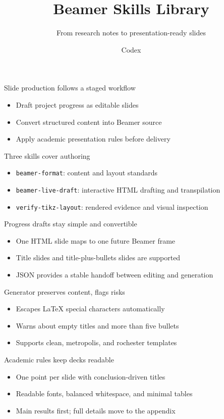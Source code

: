 \documentclass[10pt]{mycool}
\title[]{Beamer Skills Library}
\subtitle[]{From research notes to presentation-ready slides}
\author[]{Codex}
\institute[]{Beamer Skills Project}
\date[]{}
\begin{document}
\frame{\titlepage}

\begin{frame}{Slide production follows a staged workflow}
\begin{itemize}
  \item Draft project progress as editable slides
  \item Convert structured content into Beamer source
  \item Apply academic presentation rules before delivery
\end{itemize}
\end{frame}

\begin{frame}{Three skills cover authoring}
\begin{itemize}
  \item \texttt{beamer-format}: content and layout standards
  \item \texttt{beamer-live-draft}: interactive HTML drafting and transpilation
  \item \texttt{verify-tikz-layout}: rendered evidence and visual inspection
\end{itemize}
\end{frame}

\begin{frame}{Progress drafts stay simple and convertible}
\begin{itemize}
  \item One HTML slide maps to one future Beamer frame
  \item Title slides and title-plus-bullets slides are supported
  \item JSON provides a stable handoff between editing and generation
\end{itemize}
\end{frame}

\begin{frame}{Generator preserves content, flags risks}
\begin{itemize}
  \item Escapes LaTeX special characters automatically
  \item Warns about empty titles and more than five bullets
  \item Supports clean, metropolis, and rochester templates
\end{itemize}
\end{frame}

\begin{frame}{Academic rules keep decks readable}
\begin{itemize}
  \item One point per slide with conclusion-driven titles
  \item Readable fonts, balanced whitespace, and minimal tables
  \item Main results first; full details move to the appendix
\end{itemize}
\end{frame}
\end{document}
